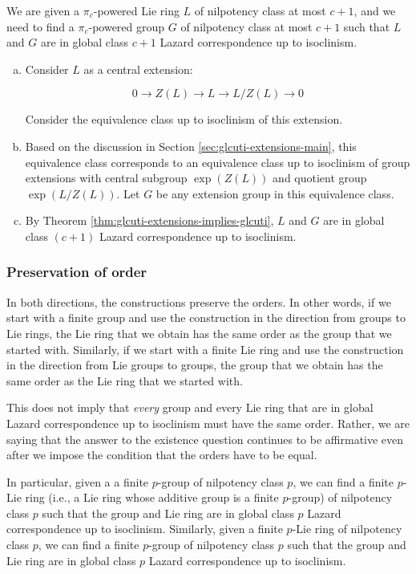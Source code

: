 We are given a $\pi_c$-powered Lie ring $L$ of nilpotency class at
most $c + 1$, and we need to find a $\pi_c$-powered group $G$ of
nilpotency class at most $c + 1$ such that $L$ and $G$ are in global
class $c + 1$ Lazard correspondence up to isoclinism.

\begin{enumerate}[(a)]
\item Consider $L$ as a central extension:

  $$0 \to Z(L) \to L \to L/Z(L) \to 0$$

  Consider the equivalence class up to isoclinism of this extension.

\item Based on the discussion in Section
  \ref{sec:glcuti-extensions-main}, this equivalence class corresponds
  to an equivalence class up to isoclinism of group extensions with
  central subgroup $\exp(Z(L))$ and quotient group $\exp(L/Z(L))$. Let
  $G$ be any extension group in this equivalence class.

\item By Theorem \ref{thm:glcuti-extensions-implies-glcuti}, $L$ and
  $G$ are in global class $(c + 1)$ Lazard correspondence up to
  isoclinism.
\end{enumerate}

\subsubsection{Preservation of order}\label{sec:glcuti-preserves-order}

In both directions, the constructions preserve the orders. In other
words, if we start with a finite group and use the construction in the
direction from groups to Lie rings, the Lie ring that we obtain has
the same order as the group that we started with. Similarly, if we
start with a finite Lie ring and use the construction in the direction
from Lie groups to groups, the group that we obtain has the same order
as the Lie ring that we started with.

This does not imply that {\em every} group and every Lie ring that are
in global Lazard correspondence up to isoclinism must have the same
order. Rather, we are saying that the answer to the existence question
continues to be affirmative even after we impose the condition that
the orders have to be equal.

In particular, given a a finite $p$-group of nilpotency class $p$, we
can find a finite $p$-Lie ring (i.e., a Lie ring whose additive group
is a finite $p$-group) of nilpotency class $p$ such that the group and
Lie ring are in global class $p$ Lazard correspondence up to
isoclinism. Similarly, given a finite $p$-Lie ring of nilpotency class
$p$, we can find a finite $p$-group of nilpotency class $p$ such that
the group and Lie ring are in global class $p$ Lazard correspondence
up to isoclinism.

